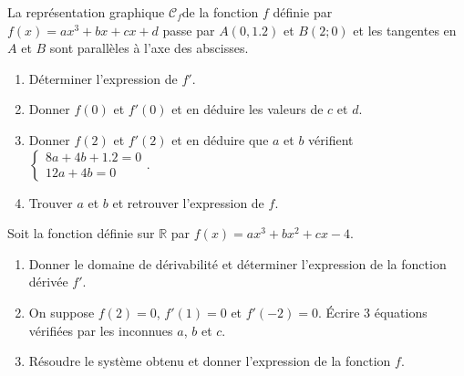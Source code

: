 \documentclass[main.tex]{subfiles}
\begin{document}
\begin{exercise} 
La représentation graphique $\mathscr{C}_f$de la fonction $f$ définie par $f(x)=ax^3+bx+cx+d$  passe par $A(0,1.2)$ et $B(2;0)$ et les tangentes en $A$ et $B$ sont parallèles à l'axe des abscisses.
	\begin{enumerate}[label={\arabic*)}, leftmargin=*]
	\item Déterminer l'expression de $f'$.
	\item Donner $f(0)$ et $f'(0)$ et en déduire les valeurs de $c$ et $d$.
	\item Donner $f(2)$ et $f'(2)$ et en déduire que $a$ et $b$ vérifient $\begin{cases}
		8a+4b+1.2=0\\
		12a+4b=0 \end{cases}$.
	\item Trouver $a$ et $b$ et retrouver l'expression de $f$.
\end{enumerate}
\end{exercise}
 \begin{exercise}  Soit la fonction définie sur $\mathbb{R}$ par $f(x)=ax^3+bx^2+cx-4$.
	\begin{enumerate}[label={\arabic*)}, leftmargin=*]
 		\item Donner le domaine de dérivabilité et déterminer l'expression de la fonction dérivée $f'$.
 		\item On suppose $f(2)=0$, $f'(1)=0$ et $f'(-2)=0$. Écrire 3 équations vérifiées par les inconnues $a$, $b$ et $c$.
 		\item Résoudre le système obtenu et donner l'expression de la fonction $f$.
 	\end{enumerate}
 \end{exercise}
 
\end{document}
